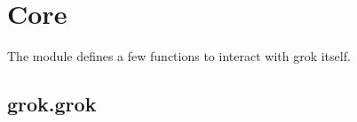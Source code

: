 \chapter{Core}

The  module defines a few functions to interact with grok itself.

    \section{grok.grok}

